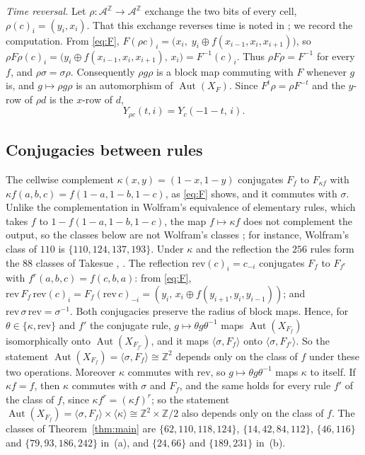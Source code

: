 \documentclass[11pt]{amsart}
\theoremstyle{definition}
\theoremstyle{remark}
\theoremstyle{plain}
\newcommand{\Z}{\mathbb{Z}}
\newcommand{\A}{\mathcal{A}}
\newcommand{\Aut}{\operatorname{Aut}}
\newcommand{\sh}{\sigma}
\begin{document}
\emph{Time reversal.} Let $\rho\colon\A^{\Z}\to\A^{\Z}$ exchange the two bits of every cell, $\rho(c)_i=(y_i,x_i)$. That this exchange reverses time is noted in \cite[p.~2500]{Takesue1987}; we record the computation. From \eqref{eq:F}, $F(\rho c)_i=\bigl(x_i,\;y_i\oplus f(x_{i-1},x_i,x_{i+1})\bigr)$, so $\rho F\rho(c)_i=\bigl(y_i\oplus f(x_{i-1},x_i,x_{i+1}),\,x_i\bigr)=F^{-1}(c)_i$. Thus $\rho F\rho=F^{-1}$ for every $f$, and $\rho\sh=\sh\rho$. Consequently $\rho g\rho$ is a block map commuting with $F$ whenever $g$ is, and $g\mapsto\rho g\rho$ is an automorphism of $\Aut(X_F)$. Since $F^t\rho=\rho F^{-t}$ and the $y$-row of $\rho d$ is the $x$-row of $d$,
\begin{equation}\label{eq:rho}
Y_{\rho c}(t,i)=Y_c(-1-t,\,i).
\end{equation}

\subsection{Conjugacies between rules}\label{sec:conj}

The cellwise complement $\kappa(x,y)=(1-x,1-y)$ conjugates $F_f$ to $F_{\kappa f}$ with $\kappa f(a,b,c)=f(1-a,1-b,1-c)$, as \eqref{eq:F} shows, and it commutes with $\sh$. Unlike the complementation in Wolfram's equivalence of elementary rules, which takes $f$ to $1-f(1-a,1-b,1-c)$, the map $f\mapsto\kappa f$ does not complement the output, so the classes below are not Wolfram's classes \cite[p.~377 and footnote~3]{Takesue1989}; for instance, Wolfram's class of $110$ is $\{110,124,137,193\}$. Under $\kappa$ and the reflection the $256$ rules form the $88$ classes of Takesue \cite{Takesue1987}, \cite[Table~I]{Takesue1989}. The reflection $\mathrm{rev}(c)_i=c_{-i}$ conjugates $F_f$ to $F_{f^r}$ with $f^r(a,b,c)=f(c,b,a)$: from \eqref{eq:F}, $\mathrm{rev}\,F_f\,\mathrm{rev}(c)_i=F_f(\mathrm{rev}\,c)_{-i}=(y_i,\,x_i\oplus f(y_{i+1},y_i,y_{i-1}))$; and $\mathrm{rev}\,\sh\,\mathrm{rev}=\sh^{-1}$. Both conjugacies preserve the radius of block maps. Hence, for $\theta\in\{\kappa,\mathrm{rev}\}$ and $f'$ the conjugate rule, $g\mapsto\theta g\theta^{-1}$ maps $\Aut(X_{F_f})$ isomorphically onto $\Aut(X_{F_{f'}})$, and it maps $\langle\sh,F_f\rangle$ onto $\langle\sh,F_{f'}\rangle$. So the statement $\Aut(X_{F_f})=\langle\sh,F_f\rangle\cong\Z^2$ depends only on the class of $f$ under these two operations. Moreover $\kappa$ commutes with $\mathrm{rev}$, so $g\mapsto\theta g\theta^{-1}$ maps $\kappa$ to itself. If $\kappa f=f$, then $\kappa$ commutes with $\sh$ and $F_f$, and the same holds for every rule $f'$ of the class of $f$, since $\kappa f^r=(\kappa f)^r$; so the statement $\Aut(X_{F_f})=\langle\sh,F_f\rangle\times\langle\kappa\rangle\cong\Z^2\times\Z/2$ also depends only on the class of $f$. The classes of Theorem~\ref{thm:main} are $\{62,110,118,124\}$, $\{14,42,84,112\}$, $\{46,116\}$ and $\{79,93,186,242\}$ in~(a), and $\{24,66\}$ and $\{189,231\}$ in~(b).
\end{document}
